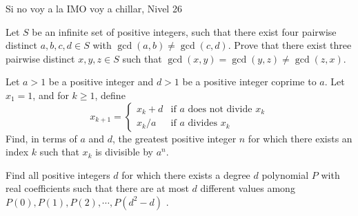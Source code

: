 \documentclass[12pt]{article}
\begin{document}
\begin{examen}{Si no voy a la IMO voy a chillar, Nivel 26}{}

\begin{problema}
Let $S$ be an infinite set of positive integers, such that there exist four pairwise distinct $a,b,c,d \in S$ with $\gcd(a,b) \neq \gcd(c,d)$. Prove that there exist three pairwise distinct $x,y,z \in S$ such that $\gcd(x,y)=\gcd(y,z) \neq \gcd(z,x)$.
\end{problema}

\begin{problema}
Let $a > 1$ be a positive integer and $d > 1$ be a positive integer coprime to $a$. Let $x_1=1$, and for $k\geq 1$, define
$$x_{k+1} = \begin{cases}
x_k + d &\text{if } a \text{ does not divide } x_k \\
x_k/a & \text{if } a \text{ divides } x_k
\end{cases}$$Find, in terms of $a$ and $d$, the greatest positive integer $n$ for which there exists an index $k$ such that $x_k$ is divisible by $a^n$.	
\end{problema}

\begin{problema}
Find all positive integers $d$ for which there exists a degree $d$ polynomial $P$ with real coefficients such that there are at most $d$ different values among $P(0),P(1),P(2),\cdots,P(d^2-d)$ .
\end{problema}

\end{examen}
\end{document}
